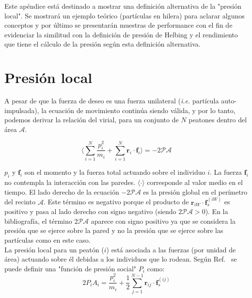 \label{appendix:presion}

Este apéndice está destinado a mostrar una definición alternativa de la "presión local". Se mostrará un ejemplo teórico (partículas en hilera) para aclarar algunos conceptos y por último se presentarán muestras de performance con el fin de evidenciar la similitud con la definición de presión de Helbing y el rendimiento que tiene el cálculo de la presión según esta definición alternativa.  
\\

\section{Presión local}

A pesar de que la fuerza de deseo es una fuerza unilateral (\textit{i.e.} partícula auto-impulsada), la ecuación de movimiento continúa siendo válida, y por lo tanto, podemos derivar la relación del virial\cite{lion}, para un conjunto de $N$ peatones dentro del área $\mathcal{A}$.

\begin{equation}
 \bigg\langle\displaystyle\sum_{i=1}^N\displaystyle\frac{p_i^2}{m_i} + 
\displaystyle\sum_{i=1}^N 
\mathbf{r}_i\cdot\mathbf{f}_i\bigg\rangle=-2\mathcal{PA}\label{virial1}
\end{equation}


$p_i$  y $\mathbf{f}_i$ son el momento y la fuerza total actuando sobre el individuo $i$. La fuerza $\mathbf{f}_i$ no contempla la interacción con las paredes.  $\langle\cdot\rangle$ corresponde al valor medio en el tiempo. El lado derecho de la ecuación $-2\mathcal{PA}$ es la presión global en el perímetro del recinto $\mathcal{A}$. Este término es negativo porque el producto de $\mathbf{r}_{iW}\cdot\mathbf{f}_s^{(iW)}$ es positivo y pasa al lado derecho con signo negativo (siendo $2\mathcal{PA}>0$). En la bibliografía, el término $2\mathcal{PA}$ aparece con signo positivo ya que se considera la presión que se ejerce sobre la pared y no la presión que se ejerce sobre las partículas como en este caso.  \\
La presión local para un peatón ($i$) está asociada a las fuerzas (por unidad de área) actuando sobre él debidas a los individuos que lo rodean. Según Ref.~\cite{lion} se puede definir una "función de presión social" $P_i$ como:\\

\begin{equation}
2P_iA_i=\displaystyle\frac{p_i^2}{m_i} + \frac{1}{2}
\displaystyle\sum_{j=1}^{N-1}
\mathbf{r}_{ij}\cdot\mathbf{f}_s^{(ij)}\label{pa}
\end{equation}

